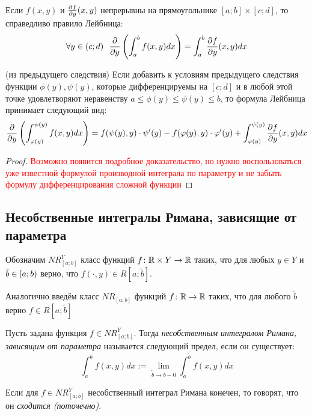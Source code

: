 \begin{corollary}
	Если $f(x, y)$ и $\frac{\partial f}{\partial y}(x, y)$ непрерывны  на прямоугольнике $[a; b] \times [c; d]$, то справедливо правило Лейбница:
	\[
		\forall y \in (c; d)\ \ \frac{\partial }{\partial y}\left(\int_a^b f(x, y)dx\right) = \int_a^b \frac{\partial f}{\partial y}(x, y)dx
	\]
\end{corollary}

\begin{corollary} (из предыдущего следствия)
	Если добавить к условиям предыдущего следствия функции $\phi(y), \psi(y)$, которые дифференцируемы на $[c; d]$ и в любой этой точке удовлетворяют неравенству $a \le \phi(y) \le \psi(y) \le b$, то формула Лейбница принимает следующий вид:
	\[
		\frac{\partial }{\partial y}\left(\int_{\varphi(y)}^{\psi(y)} f(x, y)dx\right) = f(\psi(y), y) \cdot \psi'(y) - f(\varphi(y), y) \cdot \varphi'(y) + \int_{\varphi(y)}^{\psi(y)} \frac{\partial f}{\partial y}(x, y)dx
	\]
\end{corollary}

\begin{proof}
	\textcolor{red}{Возможно появится подробное доказательство, но нужно воспользоваться уже известной формулой производной интеграла по параметру и не забыть формулу дифференцирования сложной функции}
\end{proof}

\subsection{Несобственные интегралы Римана, зависящие от параметра}

\begin{note}
	Обозначим $NR_{[a; b]}^Y$ класс функций $f \colon \mathbb{R} \times Y \to \mathbb{R}$ таких, что для любых $y \in Y$ и $\tilde{b} \in \left[a; b\right)$ верно, что $f(\cdot, y) \in R[a; \tilde{b}]$.
\end{note}

\begin{note}
	Аналогично введём класс $NR_{[a; b]}$ функций $f \colon \mathbb{R} \to \mathbb{R}$ таких, что для любого $\tilde{b}$ верно $f \in R[a; \tilde{b}]$
\end{note}

\begin{definition} 
	Пусть задана функция $f \in NR_{[a; b]}^Y$. Тогда \textit{несобственным интегралом Римана, зависящим от параметра} называется следующий предел, если он существует:
	\[
		\int_a^b f(x, y)dx := \lim_{\tilde{b} \to b-0} \int_a^{\tilde{b}} f(x, y)dx
	\]
\end{definition}

\begin{definition}
	Если для $f \in NR_{[a; b]}^Y$ несобственный интеграл Римана конечен, то говорят, что он \textit{сходится (поточечно)}.
\end{definition}


